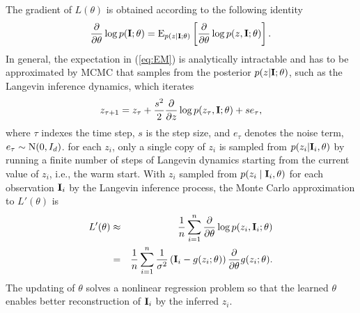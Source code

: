 \documentclass[11pt]{article}
\def\E{{\rm E}}
\def\I{{\bf I}}
\begin{document}
The gradient of $L(\theta)$ is obtained according to the following identity
\begin{align}
\frac{\partial}{\partial \theta} \log p(\I; \theta) = \E_{p(z|\I; \theta)} \left[ \frac{\partial}{\partial \theta} \log p(z, \I;  \theta)\right].  \label{eq:EM}
\end{align}
In general, the expectation in (\ref{eq:EM}) is analytically intractable and has to be approximated by MCMC that samples from the posterior $p(z|\I; \theta)$, such as the Langevin inference dynamics, which iterates
\begin{eqnarray}
z_{\tau + 1} = z_\tau + \frac{s^2 }{2}\frac{\partial}{\partial z}  \log p(z_\tau, \I;  \theta) + s e_\tau,  \label{eq:LangevinG}
\end{eqnarray}
where  $\tau$ indexes the time step, $s$ is the step size, and  $e_\tau$  denotes the noise term,  $e_\tau \sim {\rm N}(0, I_d)$. for each $z_i$, only a single copy of $z_i$ is sampled from $p(z_i|\I_i, \theta)$ by running a finite number of steps of Langevin dynamics starting from the current value of $z_i$, i.e., the warm start. With  $z_i$ sampled from  $p(z_i \mid \I_i, \theta)$ for each observation $\I_i$ by the Langevin inference process,  the Monte Carlo approximation to $L'(\theta)$ is
\begin{eqnarray}
L'(\theta) &\approx& \frac{1}{n}  \sum_{i=1}^{n} \frac{\partial}{\partial \theta} \log p(z_i, \I_i;  \theta) \nonumber \\
&=& \frac{1}{n}  \sum_{i=1}^{n} \frac{1}{\sigma^2} \left(\I_i - g(z_i; \theta)\right)\frac{\partial}{\partial \theta} g(z_i; \theta). \label{eq:learningG}
\end{eqnarray}
The updating of $\theta$ solves a nonlinear regression problem so that the learned $\theta$ enables better reconstruction of $\I_i$ by the inferred $z_i$.
\end{document}
